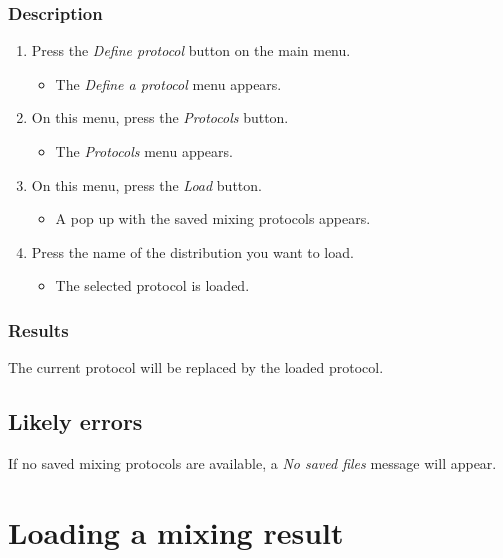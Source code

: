 \subsubsection{Description}
\begin{enumerate}
	\item Press the \emph{Define protocol} button on the main menu.
		\begin{itemize}
            \item The \emph{Define a protocol} menu appears.
		\end{itemize}
	\item On this menu, press the \emph{Protocols} button.
		\begin{itemize}
             \item The \emph{Protocols} menu appears.
		\end{itemize}
	\item On this menu, press the \emph{Load} button.
		\begin{itemize}
            \item A pop up with the saved mixing protocols appears.
		\end{itemize}
    \item Press the name of the distribution you want to load.
   		\begin{itemize}
            \item The selected protocol is loaded.
		\end{itemize}
\end{enumerate}

\subsubsection{Results}
The current protocol will be replaced by the loaded protocol.

\subsection{Likely errors}
If no saved mixing protocols are available, a \emph{No saved files} message will appear.


\section{Loading a mixing result}
\label{sec:loadMixResult}

